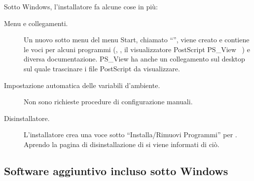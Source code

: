 \documentclass{article}
\begin{document}
Sotto Windows, l'installatore fa alcune cose in più:
\begin{description}
\item[Menu e collegamenti.] Un nuovo sotto menu del menu Start, chiamato
  ``\TL{}'', viene creato e contiene le voci per alcuni programmi \GUI{}
  (, , il visualizzatore PostScript PS\_View
  \Dash\ ) e diversa documentazione. PS\_View ha anche un
  collegamento sul desktop sul quale trascinare i file PostScript da
  visualizzare.
\item[Impostazione automatica delle variabili d'ambiente.] Non sono
  richieste procedure di configurazione manuali.
\item[Disinstallatore.] L'installatore crea una voce sotto
  ``Installa/Rimuovi Programmi'' per \TL. Aprendo la pagina di
  disinstallazione di  si viene informati di ciò.
\end{description}

\subsection{Software aggiuntivo incluso sotto Windows}
\end{document}
